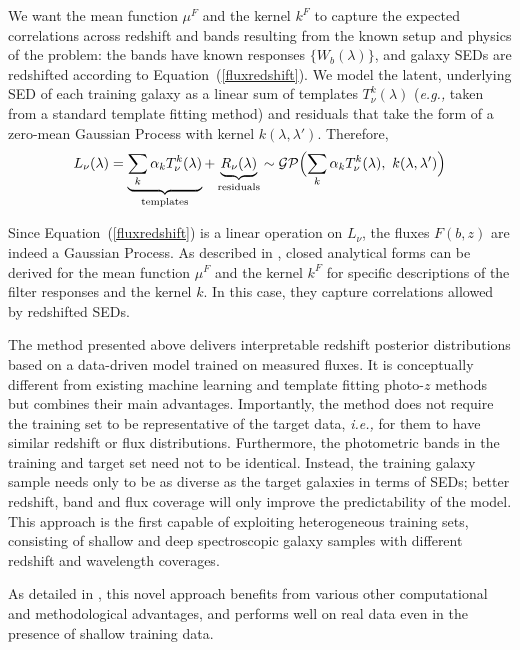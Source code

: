 \documentclass[9pt, conference, a4paper]{IEEEtran}
\newcommand{\equref}[1]{\xspace Equation~(\ref{#1})}
\newcommand{\ie}{\textit{i.e.,}\xspace}
\newcommand{\eg}{\textit{e.g.,}\xspace}
\newcommand{\eqn}[1]{\begin{eqnarray}#1\end{eqnarray}}
\begin{document}
We want the mean function $\mu^F$ and the kernel $k^F$ to capture the expected correlations across redshift and bands resulting from the known setup and physics of the problem: the bands have known responses $\{ W_b(\lambda)\}$, and galaxy SEDs are redshifted according to \equref{fluxredshift}.  We model the latent, underlying SED of each training galaxy as a linear sum of templates $T^k_\nu(\lambda)$ (\eg taken from a standard template fitting method) and residuals that take the form of a  zero-mean Gaussian Process with kernel $k(\lambda, \lambda')$. Therefore, 
\eqn{
	L_\nu(\lambda) = \underbrace{\sum_k \alpha_k T^k_\nu(\lambda)}_\mathrm{templates} + \underbrace{R_\nu(\lambda)}_\mathrm{residuals}  \sim \mathcal{GP}\Bigl(\sum_k \alpha_k T^k_\nu(\lambda), \ k(\lambda, \lambda')\Bigr)\nonumber
	}

Since \equref{fluxredshift} is a linear operation on $L_\nu$, the fluxes $F(b, z)$ are indeed a Gaussian Process. As described in \cite{LeistedtHogg:2016}, closed analytical forms can be derived for the mean function $\mu^F$ and the kernel $k^F$ for specific descriptions of the filter responses and the kernel $k$. In this case, they capture correlations allowed by redshifted SEDs.

The method presented above delivers interpretable redshift posterior distributions based on a data-driven model trained on measured fluxes. It is conceptually different from existing machine learning and template fitting photo-$z$ methods but combines their main advantages. Importantly, the method does not require the training set to be representative of the target data, \ie for them to have similar redshift or flux distributions. Furthermore, the photometric bands in the training and target set need not to be identical. Instead, the training galaxy sample needs only to be as diverse as the target galaxies in terms of SEDs; better redshift, band and flux coverage will only improve the predictability of the model. This approach is the first capable of exploiting heterogeneous training sets, consisting of shallow and deep spectroscopic galaxy samples with different redshift and wavelength coverages.

As detailed in \cite{LeistedtHogg:2016}, this novel approach benefits from various other computational and methodological advantages, and performs well on real data even in the presence of shallow training data. 



\end{document}
